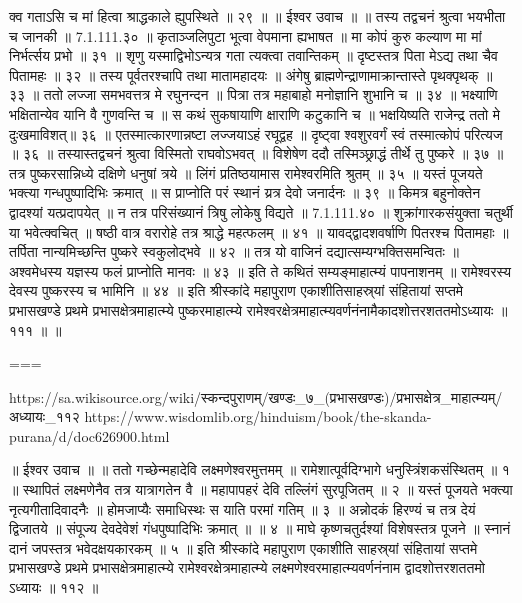 क्व गताऽसि च मां हित्वा श्राद्धकाले ह्युपस्थिते ॥ २९ ॥
॥ ईश्वर उवाच ॥ ॥
तस्य तद्वचनं श्रुत्वा भयभीता च जानकी ॥ 7.1.111.३० ॥
कृताञ्जलिपुटा भूत्वा वेपमाना ह्यभाषत ॥
मा कोपं कुरु कल्याण मा मां निर्भर्त्सय प्रभो ॥ ३१ ॥
शृणु यस्माद्विभोऽन्यत्र गता त्यक्त्वा तवान्तिकम् ॥
दृष्टस्तत्र पिता मेऽद्य तथा चैव पितामहः ॥ ३२ ॥
तस्य पूर्वतरश्चापि तथा मातामहादयः ॥
अंगेषु ब्राह्मणेन्द्राणामाक्रान्तास्ते पृथक्पृथक् ॥ ३३ ॥
ततो लज्जा समभवत्तत्र मे रघुनन्दन ॥
पित्रा तत्र महाबाहो मनोज्ञानि शुभानि च ॥ ३४ ॥
भक्ष्याणि भक्षितान्येव यानि वै गुणवन्ति च ॥
स कथं सुकषायाणि क्षाराणि कटुकानि च ॥
भक्षयिष्यति राजेन्द्र ततो मे दुःखमाविशत्॥ ३६ ॥
एतस्मात्कारणान्नष्टा लज्जयाऽहं रघूद्वह ॥
दृष्ट्वा श्वशुरवर्गं स्वं तस्मात्कोपं परित्यज ॥ ३६ ॥
तस्यास्तद्वचनं श्रुत्वा विस्मितो राघवोऽभवत् ॥
विशेषेण ददौ तस्मिञ्छ्राद्धं तीर्थे तु पुष्करे ॥ ३७ ॥
तत्र पुष्करसान्निध्ये दक्षिणे धनुषां त्रये ॥
लिंगं प्रतिष्ठयामास रामेश्वरमिति श्रुतम् ॥ ३५ ॥
यस्तं पूजयते भक्त्या गन्धपुष्पादिभिः क्रमात् ॥
स प्राप्नोति परं स्थानं य्रत्र देवो जनार्दनः ॥ ३९ ॥
किमत्र बहुनोक्तेन द्वादश्यां यत्प्रदापयेत् ॥
न तत्र परिसंख्यानं त्रिषु लोकेषु विद्यते ॥ 7.1.111.४० ॥
शुक्रांगारकसंयुक्ता चतुर्थी या भवेत्क्वचित् ॥
षष्ठी वात्र वरारोहे तत्र श्राद्धे महत्फलम् ॥ ४१ ॥
यावद्द्वादशवर्षाणि पितरश्च पितामहाः ॥
तर्पिता नान्यमिच्छन्ति पुष्करे स्वकुलोद्भवे ॥ ४२ ॥
तत्र यो वाजिनं दद्यात्सम्यग्भक्तिसमन्वितः ॥
अश्वमेधस्य यज्ञस्य फलं प्राप्नोति मानवः ॥ ४३ ॥
इति ते कथितं सम्यङ्माहात्म्यं पापनाशनम् ॥
रामेश्वरस्य देवस्य पुष्करस्य च भामिनि ॥ ४४ ॥
इति श्रीस्कांदे महापुराण एकाशीतिसाहस्र्यां संहितायां सप्तमे प्रभासखण्डे प्रथमे प्रभासक्षेत्रमाहात्म्ये पुष्करमाहात्म्ये रामेश्वरक्षेत्रमाहात्म्यवर्णनंनामैकादशोत्तरशततमोऽध्यायः ॥ १११ ॥ ॥

===

https://sa.wikisource.org/wiki/स्कन्दपुराणम्/खण्डः_७_(प्रभासखण्डः)/प्रभासक्षेत्र_माहात्म्यम्/अध्यायः_११२
https://www.wisdomlib.org/hinduism/book/the-skanda-purana/d/doc626900.html


॥ ईश्वर उवाच ॥ ॥
ततो गच्छेन्महादेवि लक्ष्मणेश्वरमुत्तमम् ॥
रामेशात्पूर्वदिग्भागे धनुस्त्रिंशकसंस्थितम् ॥ १ ॥
स्थापितं लक्ष्मणेनैव तत्र यात्रागतेन वै ॥
महापापहरं देवि तल्लिंगं सुरपूजितम् ॥ २ ॥
यस्तं पूजयते भक्त्या नृत्यगीतादिवादनैः ॥
होमजाप्यैः समाधिस्थः स याति परमां गतिम् ॥ ३ ॥
अन्नोदकं हिरण्यं च तत्र देयं द्विजातये ॥
संपूज्य देवदेवेशं गंधपुष्पादिभिः क्रमात् ॥ ॥ ४ ॥
माघे कृष्णचतुर्दश्यां विशेषस्तत्र पूजने ॥
स्नानं दानं जपस्तत्र भवेदक्षयकारकम् ॥ ५ ॥
इति श्रीस्कांदे महापुराण एकाशीति साहस्र्यां संहितायां सप्तमे प्रभासखण्डे प्रथमे प्रभासक्षेत्रमाहात्म्ये रामेश्वरक्षेत्रमाहात्म्ये लक्ष्मणेश्वरमाहात्म्यवर्णनंनाम द्वादशोत्तरशततमो ऽध्यायः ॥ ११२ ॥


